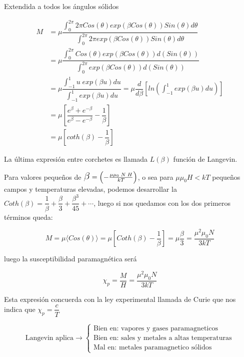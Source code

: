 Extendida a todos los ángulos sólidos

\begin{equation}
\begin{aligned}
	M &= \mu \dfrac{\int_{0}^{2\pi} 2\pi Cos(\theta)exp(\beta Cos(\theta)) Sin(\theta)d\theta}{\int_{0}^{2\pi} 2\pi exp(\beta Cos(\theta)) Sin(\theta)d\theta}\\
	&= \mu \dfrac{\int_{0}^{2\pi} Cos(\theta)exp(\beta Cos(\theta)) d(Sin(\theta))}{\int_{0}^{2\pi} exp(\beta Cos(\theta)) d(Sin(\theta))}	\\
	&=
\mu \dfrac{\int_{-1}^{1} u\; exp(\beta u) du}{\int_{-1}^{1} exp(\beta u) du}	= \mu\dfrac{d}{d\beta}\left[ ln \left( \int_{-1}^{1} exp(\beta u) du \right)  \right] \\
	&= \mu \left[ \dfrac{e^{\beta}+e^{-\beta}}{e^{\beta}-e^{-\beta}}-\dfrac{1}{\beta} \right] \\
	&= \mu\left[ coth(\beta)-\dfrac{1}{\beta} \right] 
\end{aligned}
\end{equation}

La última expresión entre corchetes es llamada $L(\beta)$ función de Langevin.

Para valores pequeños de $\Bb{\beta} =\left( -\frac{\mu\mu_{0}\;N\;H}{kT}\right)$, o sea para $\mu\mu_{0}H < kT$ pequeños campos y temperaturas elevadas, podemos desarrollar la $Coth(\beta)= \dfrac{1}{\beta}+\dfrac{\beta}{3}+\dfrac{\beta^{3}}{45}+ \cdots$, luego si nos quedamos
con los dos primeros términos queda:

\begin{equation}
	M=\mu\langle Cos (\theta) \rangle= \mu \left[ Coth(\beta)-\dfrac{1}{\beta} \right] = \mu\dfrac{\beta}{3} = \dfrac{\mu^{2}\mu_{0}N}{3kT}
\end{equation}

luego la susceptibilidad paramagnética será

\begin{equation}
	\chi_{p} = \dfrac{M}{H} = \dfrac{\mu^{2}\mu_{0}N}{3kT}
\end{equation}

Esta expresión concuerda con la ley experimental llamada de Curie que nos indica que $\chi_{p}=\dfrac{c}{T}$

\begin{equation*}
\text{Langevin aplica} \rightarrow
				\begin{cases}
  				\text{Bien en: vapores y gases paramagneticos} \\
 				\text{Bien en: sales y metales a altas temperaturas} \\
  				\text{Mal en: metales paramagnetico sólidos}
    			\end{cases}
\end{equation*}

